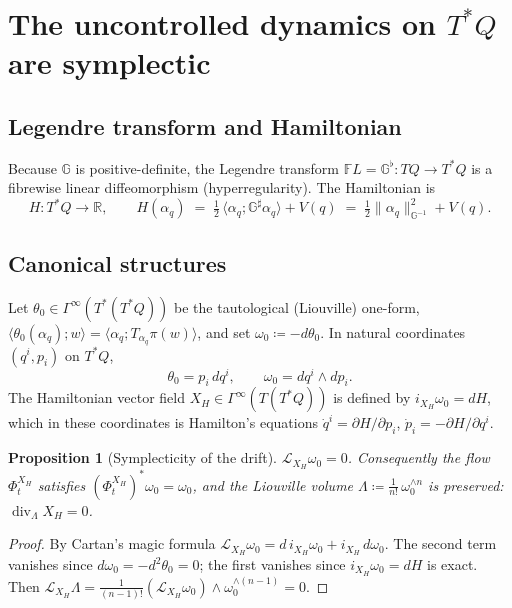 \documentclass[11pt,a4paper]{article}
\newcommand{\Gm}{\mathbb{G}}                      %
\newcommand{\Rm}{\mathbb{R}}
\newcommand{\dpair}[2]{\langle #1 ; #2 \rangle}   %
\newcommand{\Gsharp}{\Gm^{\sharp}}
\newcommand{\Gflat}{\Gm^{\flat}}
\newcommand{\dive}{\operatorname{div}}
\newcommand{\Gsec}[1]{\Gamma^{\infty}(#1)}
\newcommand{\Lie}{\mathcal{L}}
\newcommand{\norm}[1]{\lVert #1 \rVert}
\newcommand{\Tstar}{T^{*}Q}
\theoremstyle{plain}
\newtheorem{proposition}[theorem]{Proposition}
\theoremstyle{definition}
\theoremstyle{remark}
\begin{document}
\section{The uncontrolled dynamics on \texorpdfstring{$\Tstar$}{T*Q} are symplectic}
\label{sec:cotangent}

\subsection{Legendre transform and Hamiltonian}

Because $\Gm$ is positive-definite, the Legendre transform
$\mathbb{F}L = \Gflat : TQ \to \Tstar$ is a fibrewise linear diffeomorphism
(hyperregularity). The Hamiltonian is
\begin{equation}
  H : \Tstar \to \Rm,
  \qquad
  H(\alpha_q) \;=\; \tfrac12\,\dpair{\alpha_q}{\Gsharp\alpha_q} + V(q)
  \;=\; \tfrac12\norm{\alpha_q}^2_{\Gm^{-1}} + V(q).
  \label{eq:H}
\end{equation}

\subsection{Canonical structures}

Let $\theta_0 \in \Gsec{T^{*}(\Tstar)}$ be the tautological (Liouville) one-form,
$\dpair{\theta_0(\alpha_q)}{w} = \dpair{\alpha_q}{T_{\alpha_q}\pi(w)}$, and set
$\omega_0 \coloneqq -d\theta_0$. In natural coordinates $(q^i,p_i)$ on $\Tstar$,
\begin{equation}
  \theta_0 = p_i\,dq^i,
  \qquad
  \omega_0 = dq^i \wedge dp_i .
  \label{eq:omega0}
\end{equation}
The Hamiltonian vector field $X_H \in \Gsec{T(\Tstar)}$ is defined by
$i_{X_H}\omega_0 = dH$, which in these coordinates is Hamilton's equations
$\dot q^i = \partial H/\partial p_i$, $\dot p_i = -\partial H/\partial q^i$.

\begin{proposition}[Symplecticity of the drift]
\label{prop:symplectic}
$\Lie_{X_H}\omega_0 = 0$. Consequently the flow $\Phi_t^{X_H}$ satisfies
$(\Phi_t^{X_H})^{*}\omega_0 = \omega_0$, and the Liouville volume
$\Lambda \coloneqq \tfrac{1}{n!}\,\omega_0^{\wedge n}$ is preserved:
$\dive_\Lambda X_H = 0$.
\end{proposition}

\begin{proof}
By Cartan's magic formula
$\Lie_{X_H}\omega_0 = d\,i_{X_H}\omega_0 + i_{X_H}\,d\omega_0$. The second term
vanishes since $d\omega_0 = -d^2\theta_0 = 0$; the first vanishes since
$i_{X_H}\omega_0 = dH$ is exact. Then
$\Lie_{X_H}\Lambda = \tfrac{1}{(n-1)!}(\Lie_{X_H}\omega_0)\wedge\omega_0^{\wedge(n-1)} = 0$.
\end{proof}
\end{document}

